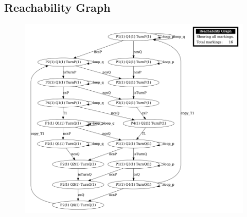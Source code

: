 \documentclass{article}
\begin{document}
\subsection{Reachability Graph}
\begin{figure}[h] 
\centering
\includegraphics[scale=0.55]{RG3.2.png}
\end{figure}
\clearpage
\end{document}
